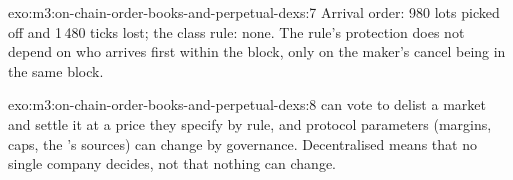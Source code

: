 \begin{solution}{exo:m3:on-chain-order-books-and-perpetual-dexs:7}
Arrival order: 980 lots picked off and 1\,480 ticks lost; the class rule: none. The rule's protection does not depend on who arrives first
within the block, only on the maker's cancel being in the same block.
\end{solution}

\begin{solution}{exo:m3:on-chain-order-books-and-perpetual-dexs:8}
 can vote to delist a market and settle it at a price they specify by rule, and protocol parameters (margins, caps, the 's
sources) can change by governance. Decentralised means that no single company decides, not that nothing can change.
\end{solution}

